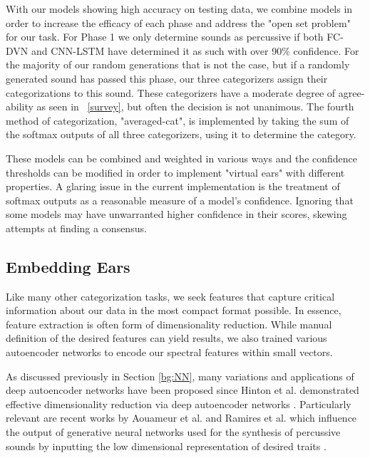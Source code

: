 \documentclass[\main/thesis.tex]{subfiles}
\begin{document}
With our models showing high accuracy on testing data, we combine models in order to increase the efficacy of each phase and address the "open set problem" for our task. For Phase 1 we only determine sounds as percussive if both FC-DVN and CNN-LSTM have determined it as such with over 90\% confidence. For the majority of our random generations that is not the case, but if a randomly generated sound has passed this phase, our three categorizers assign their categorizations to this sound. These categorizers have a moderate degree of agree-ability as seen in ~\ref{survey}, but often the decision is not unanimous. The fourth method of categorization, "averaged-cat", is implemented by taking the sum of the softmax outputs of all three categorizers, using it to determine the category. 

These models can be combined and weighted in various ways and the confidence thresholds can be modified in order to implement "virtual ears" with different properties. A glaring issue in the current implementation is the treatment of softmax outputs as a reasonable measure of a model's confidence. Ignoring that some models may have unwarranted higher confidence in their scores, skewing attempts at finding a consensus. 


\subsection{Embedding Ears}
% 
Like many other categorization tasks, we seek features that capture critical information about our data in the most compact format possible. In essence, feature extraction is often form of dimensionality reduction. While manual definition of the desired features can yield results, we also trained various autoencoder networks to encode our spectral features within small vectors. 

As discussed previously in Section \ref{bg:NN}, many variations and applications of deep autoencoder networks have been proposed since Hinton et al. demonstrated effective dimensionality reduction via deep autoencoder networks \cite{hinton1994autoencoders,hinton2006reducing}. Particularly relevant are recent works by Aouameur et al. and Ramires et al. which influence the output of generative neural networks used for the synthesis of percussive sounds by inputting the low dimensional representation of desired traits \cite{aouameur2019neural,ramires2020neural}. 
\end{document}
